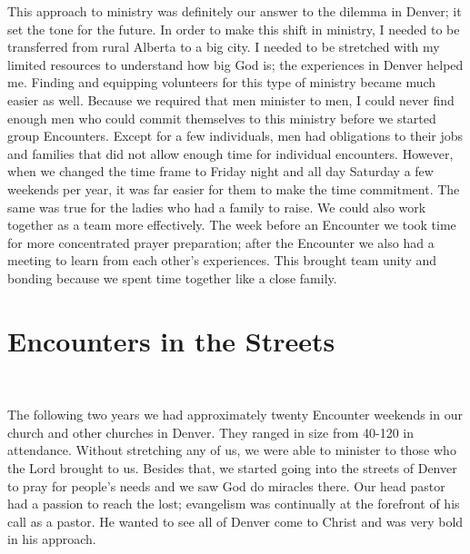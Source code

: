 \documentclass[oneside]{book}
\begin{document}
This approach to ministry was definitely our answer to the dilemma in Denver; it set the tone for the future. In order to make this shift in ministry, I needed to be transferred from rural Alberta to a big city. I needed to be stretched with my limited resources to understand how big God is; the experiences in Denver helped me. Finding and equipping volunteers for this type of ministry became much easier as well. Because we required that men minister to men, I could never find enough men who could commit themselves to this ministry before we started group Encounters. Except for a few individuals, men had obligations to their jobs and families that did not allow enough time for individual encounters. However, when we changed the time frame to Friday night and all day Saturday a few weekends per year, it was far easier for them to make the time commitment. The same was true for the ladies who had a family to raise. We could also work together as a team more effectively. The week before an Encounter we took time for more concentrated prayer preparation; after the Encounter we also had a meeting to learn from each other’s experiences. This brought team unity and bonding because we spent time together like a close family. 


\section{Encounters in the Streets}
\

The following two years we had approximately twenty Encounter weekends in our church and other churches in Denver. They ranged in size from 40-120 in attendance. Without stretching any of us, we were able to minister to those who the Lord brought to us. Besides that, we started going into the streets of Denver to pray for people’s needs and we saw God do miracles there. Our head pastor had a passion to reach the lost; evangelism was continually at the forefront of his call as a pastor. He wanted to see all of Denver come to Christ and was very bold in his approach. 
\end{document}
